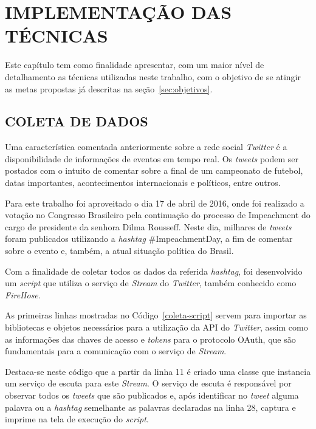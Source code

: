 \chapter{IMPLEMENTAÇÃO DAS TÉCNICAS}\label{ch:implementacao}

Este capítulo tem como finalidade apresentar, com um maior nível de detalhamento as técnicas utilizadas neste trabalho, com o objetivo de se atingir as metas propostas já descritas na seção~\ref{sec:objetivos}.

\section{COLETA DE DADOS}
Uma característica comentada anteriormente sobre a rede social \textit{Twitter} é a disponibilidade de informações de eventos em tempo real. Os \textit{tweets} podem ser postados com o intuito de comentar sobre a final de um campeonato de futebol, datas importantes, acontecimentos internacionais e políticos, entre outros.

Para este trabalho foi aproveitado o dia 17 de abril de 2016, onde foi realizado a votação no Congresso Brasileiro pela continuação do processo de Impeachment do cargo de presidente da senhora Dilma Rousseff. Neste dia, milhares de \textit{tweets} foram publicados utilizando a \textit{hashtag} \#ImpeachmentDay, a fim de comentar sobre o evento e, também, a atual situação política do Brasil.

Com a finalidade de coletar todos os dados da referida \textit{hashtag}, foi desenvolvido um \textit{script} que utiliza o serviço de \textit{Stream} do \textit{Twitter}, também conhecido como \textit{FireHose}.

As primeiras linhas mostradas no Código~\ref{coleta-script} servem para importar as bibliotecas e objetos necessários para a utilização da API do \textit{Twitter}, assim como as informações das chaves de acesso e \textit{tokens} para o protocolo OAuth, que são fundamentais para a comunicação com o serviço de \textit{Stream}.



Destaca-se neste código que a partir da linha 11 é criado uma classe que instancia um serviço de escuta para este \textit{Stream}. O serviço de escuta é responsável por observar todos os \textit{tweets} que são publicados e, após identificar no \textit{tweet} alguma palavra ou a \textit{hashtag} semelhante as palavras declaradas na linha 28, captura e imprime na tela de execução do \textit{script}.

